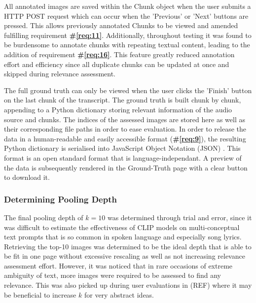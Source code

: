 \documentclass{l4proj}
\begin{document}
All annotated images are saved within the Chunk object when the user submits a HTTP POST request which can occur when the 'Previous' or 'Next' buttons are pressed. This allows previously annotated Chunks to be viewed and amended fulfilling requirement \textbf{\#\ref{req:11}}. Additionally, throughout testing it was found to be burdensome to annotate chunks with repeating textual content, leading to the addition of requirement \textbf{\#\ref{req:16}}. This feature greatly reduced annotation effort and efficiency since all duplicate chunks can be updated at once and skipped during relevance assessment.

The full ground truth can only be viewed when the user clicks the 'Finish' button on the last chunk of the transcript. The ground truth is built chunk by chunk, appending to a Python dictionary storing relevant information of the audio source and chunks. The indices of the assessed images are stored here as well as their corresponding file paths in order to ease evaluation. In order to release the data in a human-readable and easily accessible format (\textbf{\#\ref{req:9}}), the resulting Python dictionary is serialised into JavaScript Object Notation (JSON) \citep{json}. This format is an open standard format that is language-independant. A preview of the data is subsequently rendered in the Ground-Truth page with a clear button to download it.

\subsubsection{Determining Pooling Depth}
The final pooling depth of $k=10$ was determined through trial and error, since it was difficult to estimate the effectiveness of CLIP models on multi-conceptual text prompts that is so common in spoken language and especially song lyrics. Retrieving the top-10 images was determined to be the ideal depth that is able to be fit in one page without excessive rescaling as well as not increasing relevance assessment effort. However, it was noticed that in rare occasions of extreme ambiguity of text, more images were required to be assessed to find any relevance. This was also picked up during user evaluations in (REF) where it may be beneficial to increase $k$ for very abstract ideas.
\end{document}
